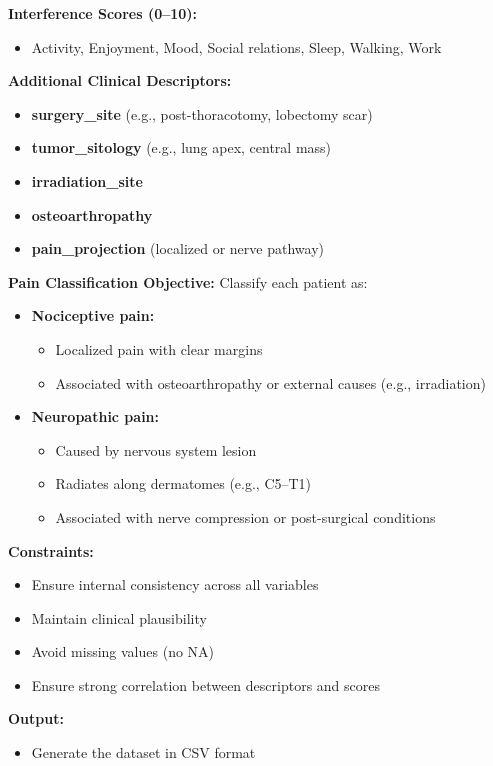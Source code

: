 \documentclass[preprint,12pt,authoryear]{elsarticle}
\begin{document}
{\begin{tcolorbox}
\textbf{Interference Scores (0--10):}
\begin{itemize}[itemsep=1pt, parsep=1pt, topsep=1pt]
    \item Activity, Enjoyment, Mood, Social relations, Sleep, Walking, Work
\end{itemize}

\textbf{Additional Clinical Descriptors:}
\begin{itemize}[itemsep=1pt, parsep=1pt, topsep=1pt]
    \item \textbf{surgery\_site} (e.g., post-thoracotomy, lobectomy scar)
    \item \textbf{tumor\_sitology} (e.g., lung apex, central mass)
    \item \textbf{irradiation\_site}
    \item \textbf{osteoarthropathy}
    \item \textbf{pain\_projection} (localized or nerve pathway)
\end{itemize}

\textbf{Pain Classification Objective:}
Classify each patient as:
\begin{itemize}[itemsep=1pt, parsep=1pt, topsep=1pt]
    \item \textbf{Nociceptive pain:}
    \begin{itemize}[itemsep=1pt, parsep=1pt, topsep=1pt]
        \item Localized pain with clear margins
        \item Associated with osteoarthropathy or external causes (e.g., irradiation)
    \end{itemize}
    \item \textbf{Neuropathic pain:}
    \begin{itemize}[itemsep=1pt, parsep=1pt, topsep=1pt]
        \item Caused by nervous system lesion
        \item Radiates along dermatomes (e.g., C5--T1)
        \item Associated with nerve compression or post-surgical conditions
    \end{itemize}
\end{itemize}

\textbf{Constraints:}
\begin{itemize}[itemsep=1pt, parsep=1pt, topsep=1pt]
    \item Ensure internal consistency across all variables
    \item Maintain clinical plausibility
    \item Avoid missing values (no NA)
    \item Ensure strong correlation between descriptors and scores
\end{itemize}

\textbf{Output:}
\begin{itemize}
    \item Generate the dataset in CSV format
\end{itemize}
\end{tcolorbox}
}
\end{document}
